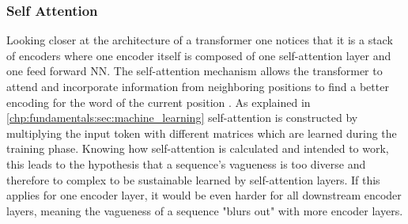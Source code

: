 \subsubsection{Self Attention}
\label{chp:study:sec:interpretation:subsec:causes:self_attention}
Looking closer at the architecture of a transformer one notices that it is a stack of encoders where one encoder itself is composed of one self-attention layer and one feed forward \ac{NN}.
The self-attention mechanism allows the transformer to attend and incorporate information from neighboring positions to find a better encoding for the word of the current position \parencite{Vaswani:2017}.
As explained in \cref{chp:fundamentals:sec:machine_learning} self-attention is constructed by multiplying the input token with different matrices which are learned during the training phase.
Knowing how self-attention is calculated and intended to work, this leads to the hypothesis that a sequence's vagueness is too diverse and therefore to complex to be sustainable learned by self-attention layers.
If this applies for one encoder layer, it would be even harder for all downstream encoder layers, meaning the vagueness of a sequence "blurs out" with more encoder layers.
